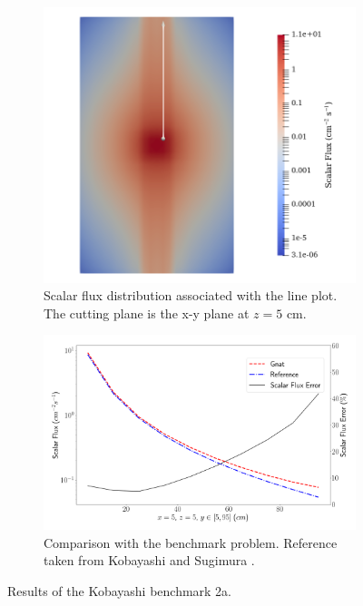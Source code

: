 \begin{figure}[H]
    \centering
    \begin{subfigure}[b]{0.4\textwidth}
        \centering
        \includegraphics[width=\textwidth]{images/verification/sn_kobayashi/2/kobayashi_2a_flux_map.png}
        \caption{Scalar flux distribution associated with the line plot. The cutting plane is the x-y plane at $z = 5\text{ cm}$.}
        \label{fig:verification:sn_kobayashi_2a:flux}
    \end{subfigure}
    \hfill
    \begin{subfigure}[b]{0.59\textwidth}
        \centering
        \includegraphics[width=\textwidth]{images/verification/sn_kobayashi/2/kobayashi_2a.png}
        \caption{Comparison with the benchmark problem. Reference taken from Kobayashi and Sugimura \cite{kobayashi_benchmarks}.}
        \label{fig:verification:sn_kobayashi_2a:line_plot}
    \end{subfigure}
    \caption{Results of the Kobayashi benchmark 2a.}
    \label{fig:verification:sn_kobayashi_2a}
\end{figure}

